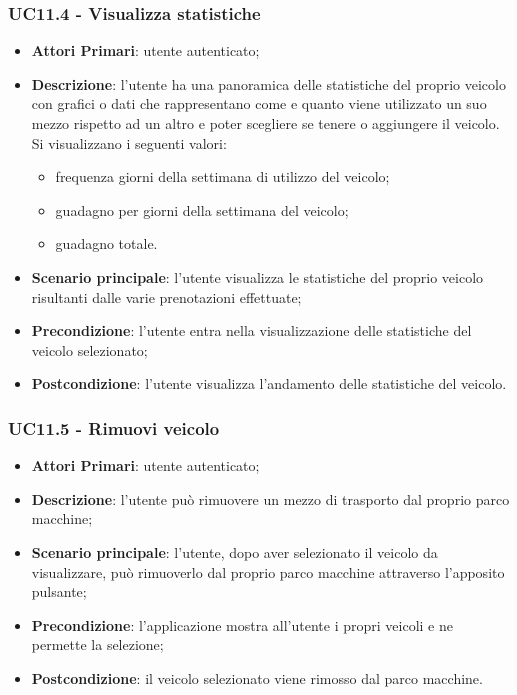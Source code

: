 \subsubsection{UC11.4 - Visualizza statistiche}
\begin{itemize}
	\item \textbf{Attori Primari}: utente autenticato;
	\item \textbf{Descrizione}: l'utente ha una panoramica delle statistiche del proprio veicolo con grafici o dati che rappresentano come e quanto viene utilizzato un suo mezzo rispetto ad un altro e poter scegliere se tenere o aggiungere il veicolo. Si visualizzano i seguenti valori:
	\begin{itemize}
		\item frequenza giorni della settimana di utilizzo del veicolo;
		\item guadagno per giorni della settimana del veicolo;
		\item guadagno totale.
	\end{itemize}
	\item \textbf{Scenario principale}: l'utente visualizza le statistiche del proprio veicolo risultanti dalle varie prenotazioni effettuate;
	\item \textbf{Precondizione}: l'utente entra nella visualizzazione delle statistiche del veicolo selezionato;
	\item \textbf{Postcondizione}: l'utente visualizza l'andamento delle statistiche del veicolo. 
\end{itemize}
\subsubsection{UC11.5 - Rimuovi veicolo}
\begin{itemize}
	\item \textbf{Attori Primari}: utente autenticato;
	\item \textbf{Descrizione}: l'utente può rimuovere un mezzo di trasporto dal proprio parco macchine;
	\item \textbf{Scenario principale}: l'utente, dopo aver selezionato il veicolo da visualizzare, può rimuoverlo dal proprio parco macchine attraverso l'apposito pulsante;
	\item \textbf{Precondizione}: l'applicazione mostra all'utente i propri veicoli e ne permette la selezione;
	\item \textbf{Postcondizione}: il veicolo selezionato viene rimosso dal parco macchine.
\end{itemize}